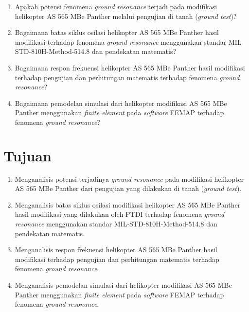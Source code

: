 \begin{enumerate}[nolistsep]
	
	\item Apakah potensi fenomena \textit{ground resonance} terjadi pada modifikasi helikopter AS 565 MBe Panther melalui pengujian di tanah (\textit{ground test})?
	
	\item Bagaimana batas siklus osilasi helikopter AS 565 MBe Panther hasil modifikasi terhadap fenomena \textit{ground resonance} menggunakan standar MIL-STD-810H-Method-514.8 dan pendekatan matematis?
	
	\item Bagaimana respon frekuensi helikopter AS 565 MBe Panther hasil modifikasi terhadap pengujian dan perhitungan matematis terhadap fenomena \textit{ground resonance}?
	
	\item Bagaimana pemodelan simulasi dari helikopter modifikasi AS 565 MBe Panther menggunakan \textit{finite element} pada \textit{software} FEMAP terhadap fenomena \textit{ground resonance}? 
\end{enumerate}

\section{Tujuan}
\label{sec:Tujuan}

\begin{enumerate}[nolistsep]

	\item Menganalisis potensi terjadinya \textit{ground resonance} pada modifikasi helikopter AS 565 MBe Panther dari pengujian yang dilakukan di tanah (\textit{ground test}).
	
	\item Menganalisis batas siklus osilasi modifikasi helikopter AS 565 MBe Panther hasil modifikasi yang dilakukan oleh PTDI terhadap fenomena \textit{ground resonance} menggunakan standar MIL-STD-810H-Method-514.8 dan pendekatan matematis.
	
	\item Menganalisis  respon frekuensi helikopter AS 565 MBe Panther hasil modifikasi terhadap pengujian dan perhitungan matematis terhadap fenomena \textit{ground resonance}.
	
	\item Menganalisis pemodelan simulasi dari helikopter modifikasi AS 565 MBe Panther menggunakan \textit{finite element} pada \textit{software} FEMAP terhadap fenomena \textit{ground resonance}.
\end{enumerate}

